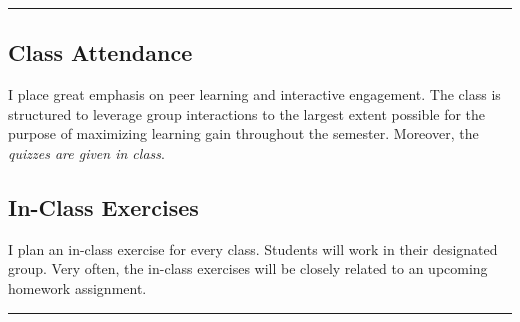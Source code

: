 \documentclass[11pt]{article}
\begin{document}


\begin{center}\rule{0.5\linewidth}{0.5pt}\end{center}

\subsection{Class Attendance}\label{class-attendance}

I place great emphasis on peer learning and interactive engagement. The class is structured to leverage group interactions to the largest extent possible for the purpose of maximizing learning gain throughout the
semester. Moreover, the \emph{quizzes are given in class}.


\subsection{In-Class Exercises}\label{in-class-exercises}

I plan an in-class exercise for every class. Students will work in their
designated group. Very often, the in-class exercises will be closely
related to an upcoming homework assignment.



\begin{center}\rule{0.5\linewidth}{0.5pt}\end{center}



\end{document}
